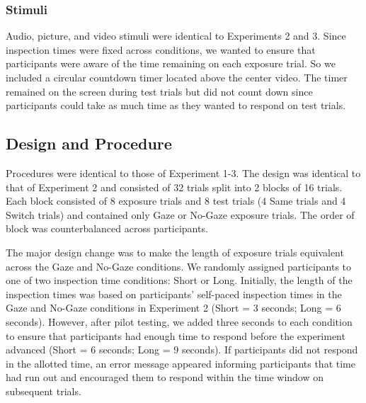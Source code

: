 \documentclass[oneside]{report}
\begin{document}
\subsubsection{Stimuli}\label{stimuli-5}

Audio, picture, and video stimuli were identical to Experiments 2 and 3.
Since inspection times were fixed across conditions, we wanted to ensure
that participants were aware of the time remaining on each exposure
trial. So we included a circular countdown timer located above the
center video. The timer remained on the screen during test trials but
did not count down since participants could take as much time as they
wanted to respond on test trials.

\subsection{Design and Procedure}\label{design-and-procedure-5}

Procedures were identical to those of Experiment 1-3. The design was
identical to that of Experiment 2 and consisted of 32 trials split into
2 blocks of 16 trials. Each block consisted of 8 exposure trials and 8
test trials (4 Same trials and 4 Switch trials) and contained only Gaze
or No-Gaze exposure trials. The order of block was counterbalanced
across participants.

The major design change was to make the length of exposure trials
equivalent across the Gaze and No-Gaze conditions. We randomly assigned
participants to one of two inspection time conditions: Short or Long.
Initially, the length of the inspection times was based on participants'
self-paced inspection times in the Gaze and No-Gaze conditions in
Experiment 2 (Short = 3 seconds; Long = 6 seconds). However, after pilot
testing, we added three seconds to each condition to ensure that
participants had enough time to respond before the experiment advanced
(Short = 6 seconds; Long = 9 seconds). If participants did not respond
in the allotted time, an error message appeared informing participants
that time had run out and encouraged them to respond within the time
window on subsequent trials.
\end{document}

